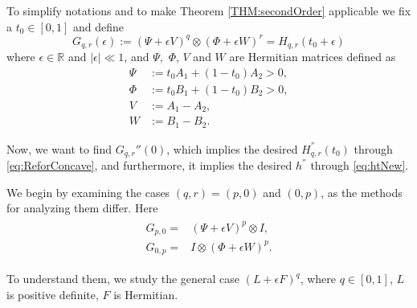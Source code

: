 \documentclass{article}
\numberwithin{equation}{section}
\begin{document}
To simplify notations and to make Theorem \ref{THM:secondOrder} applicable we fix a $t_0\in [0,1]$ and define
\begin{equation}\label{eq:ReforConcave}
G_{q,r}(\epsilon):=  (\Psi + \epsilon V)^q \otimes (\Phi + \epsilon W)^r=H_{q, r}(t_0 + \epsilon)
\end{equation}
where $\epsilon\in \mathbb{R}$ and $|\epsilon| \ll 1$, and $\Psi,$ $\Phi$, $V$ and $W$ are Hermitian matrices defined as
\begin{align*}
    \Psi &:= t_0 A_1 + (1 - t_0) A_2>0, \\
    \Phi &:= t_0 B_1 + (1 - t_0) B_2>0 ,\\
    V &:= A_1 - A_2 ,\\
    W &:= B_1 - B_2.
\end{align*}


Now, we want to find $G_{q, r}''(0)$, which implies the desired $H^{''}_{q,r}(t_0)$ through \eqref{eq:ReforConcave}, and furthermore, it implies the desired $h^{''}$ through \eqref{eq:htNew}.

We begin by examining the cases $(q, r) = (p, 0)$ and $(0, p)$, as the methods for analyzing them differ. Here
\begin{align}
\begin{split}\label{eqn:base}
G_{p, 0} =& (\Psi + \epsilon V)^p \otimes I,\\
G_{0, p} =& I \otimes (\Phi + \epsilon W)^p.
\end{split}
\end{align}

To understand them, we study the general case $(L+\epsilon F)^{q}$, where $q\in [0,1]$, $L$ is positive definite, $F$ is Hermitian.
\end{document}
